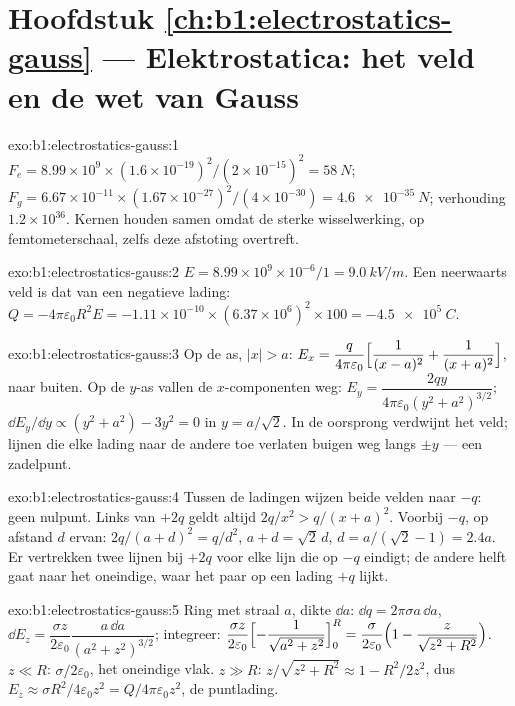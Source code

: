 \section*{Hoofdstuk \ref{ch:b1:electrostatics-gauss} --- Elektrostatica: het veld en de wet van Gauss}

\begin{solution}{exo:b1:electrostatics-gauss:1}
$F_e = 8.99 \times 10^9 \times (1.6 \times 10^{-19})^2/(2 \times 10^{-15})^2 = \qty{58}{N}$;
$F_g = 6.67 \times 10^{-11} \times (1.67 \times 10^{-27})^2/(4 \times 10^{-30}) =
\qty{4.6e-35}{N}$; verhouding $1.2 \times 10^{36}$. Kernen houden samen omdat de sterke
wisselwerking, op femtometerschaal, zelfs deze afstoting overtreft.
\end{solution}

\begin{solution}{exo:b1:electrostatics-gauss:2}
$E = 8.99 \times 10^9 \times 10^{-6}/1 = \qty{9.0}{kV/m}$. Een neerwaarts veld is
dat van een negatieve lading: $Q = -4\pi\varepsilon_0R^2E = -1.11 \times 10^{-10} \times
(6.37 \times 10^6)^2 \times 100 = \qty{-4.5e5}{C}$.
\end{solution}

\begin{solution}{exo:b1:electrostatics-gauss:3}
Op de as, $|x| > a$: $E_x = \dfrac{q}{4\pi\varepsilon_0}\Bigl[\dfrac{1}{(x - a)^2} +
\dfrac{1}{(x + a)^2}\Bigr]$, naar buiten. Op de $y$-as vallen de $x$-componenten
weg: $E_y = \dfrac{2qy}{4\pi\varepsilon_0(y^2 + a^2)^{3/2}}$; $\dd E_y/\dd y \propto
(y^2 + a^2) - 3y^2 = 0$ in $y = a/\sqrt2$. In de oorsprong verdwijnt het
veld; lijnen die elke lading naar de andere toe verlaten buigen weg langs
$\pm y$ --- een zadelpunt.
\end{solution}

\begin{solution}{exo:b1:electrostatics-gauss:4}
Tussen de ladingen wijzen beide velden naar $-q$: geen nulpunt. Links van
$+2q$ geldt altijd $2q/x^2 > q/(x + a)^2$. Voorbij $-q$, op afstand $d$ ervan:
$2q/(a + d)^2 = q/d^2$, $a + d = \sqrt2\,d$, $d = a/(\sqrt2 - 1) = 2.4a$.
Er vertrekken twee lijnen bij $+2q$ voor elke lijn die op $-q$ eindigt; de andere helft gaat naar
het oneindige, waar het paar op een lading $+q$ lijkt.
\end{solution}

\begin{solution}{exo:b1:electrostatics-gauss:5}
Ring met straal $a$, dikte $\dd a$: $\dd q = 2\pi\sigma a\,\dd a$, $\dd E_z =
\dfrac{\sigma z}{2\varepsilon_0}\dfrac{a\,\dd a}{(a^2 + z^2)^{3/2}}$; integreer:
$\dfrac{\sigma z}{2\varepsilon_0}\Bigl[-\dfrac{1}{\sqrt{a^2 + z^2}}\Bigr]_0^R = \dfrac{\sigma}{2\varepsilon_0}
\Bigl(1 - \dfrac{z}{\sqrt{z^2 + R^2}}\Bigr)$. $z \ll R$: $\sigma/2\varepsilon_0$, het
oneindige vlak. $z \gg R$: $z/\sqrt{z^2 + R^2} \approx 1 - R^2/2z^2$, dus $E_z
\approx \sigma R^2/4\varepsilon_0z^2 = Q/4\pi\varepsilon_0z^2$, de puntlading.
\end{solution}

